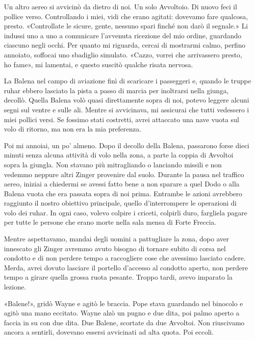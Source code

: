 Un altro aereo si avvicinò da dietro di noi. Un solo Avvoltoio. Di nuovo
feci il pollice verso. Controllando i miei, vidi che erano agitati:
dovevamo fare qualcosa, presto. «Controllate le sicure, gente, nessuno
spari finché non darò il segnale.» Li indussi uno a uno a comunicare
l'avvenuta ricezione del mio ordine, guardando ciascuno negli occhi. Per
quanto mi riguarda, cercai di mostrarmi calmo, perfino annoiato,
soffocai uno sbadiglio simulato. «Cazzo, vorrei che arrivassero presto,
ho fame», mi lamentai, e questo suscitò qualche risata nervosa.

La Balena nel campo di aviazione finì di scaricare i passeggeri e,
quando le truppe ruhar ebbero lasciato la pista a passo di marcia per
inoltrarsi nella giunga, decollò. Quella Balena volò quasi direttamente
sopra di noi, potevo leggere alcuni segni sul ventre e sulle ali. Mentre
si avvicinava, mi assicurai che tutti vedessero i miei pollici versi. Se
fossimo stati costretti, avrei attaccato una nave vuota sul volo di
ritorno, ma non era la mia preferenza.

Poi mi annoiai, un po' almeno. Dopo il decollo della Balena, passarono
forse dieci minuti senza alcuna attività di volo nella zona, a parte la
coppia di Avvoltoi sopra la giungla. Non stavano più mitragliando o
lanciando missili e non vedemmo neppure altri Zinger provenire dal
suolo. Durante la pausa nel traffico aereo, iniziai a chiedermi se
avessi fatto bene a non sparare a quel Dodo o alla Balena vuota che era
passata sopra di noi prima. Entrambe le azioni avrebbero raggiunto il
nostro obiettivo principale, quello d'interrompere le operazioni di volo
dei ruhar. In ogni caso, volevo colpire i criceti, colpirli duro,
fargliela pagare per tutte le persone che erano morte nella sala mensa
di Forte Freccia.

Mentre aspettavamo, mandai degli uomini a pattugliare la zona, dopo aver
innescato gli Zinger avremmo avuto bisogno di tornare subito di corsa
nel condotto e di non perdere tempo a raccogliere cose che avessimo
lasciato cadere. Merda, avrei dovuto lasciare il portello d'accesso al
condotto aperto, non perdere tempo a girare quella grossa ruota pesante.
Troppo tardi, avevo imparato la lezione.

«Balene!», gridò Wayne e agitò le braccia. Pope stava guardando nel
binocolo e agitò una mano eccitato. Wayne alzò un pugno e due dita, poi
palmo aperto a faccia in su con due dita. Due Balene, scortate da due
Avvoltoi. Non riuscivamo ancora a sentirli, dovevano essersi avvicinati
ad alta quota. Poi eccoli.

